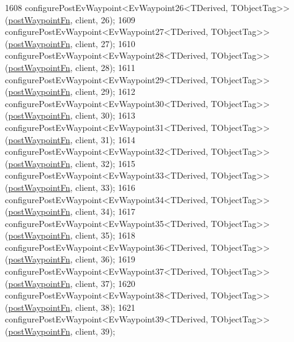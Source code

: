 \begin{DoxyCode}
1608     configurePostEvWaypoint<EvWaypoint26<TDerived, TObjectTag>>(\hyperlink{classmove__base__z__client_1_1WaypointEventDispatcher_acc538eb7506c13f7cca2268a1742dadd}{postWaypointFn}, client, 26);
1609     configurePostEvWaypoint<EvWaypoint27<TDerived, TObjectTag>>(\hyperlink{classmove__base__z__client_1_1WaypointEventDispatcher_acc538eb7506c13f7cca2268a1742dadd}{postWaypointFn}, client, 27);
1610     configurePostEvWaypoint<EvWaypoint28<TDerived, TObjectTag>>(\hyperlink{classmove__base__z__client_1_1WaypointEventDispatcher_acc538eb7506c13f7cca2268a1742dadd}{postWaypointFn}, client, 28);
1611     configurePostEvWaypoint<EvWaypoint29<TDerived, TObjectTag>>(\hyperlink{classmove__base__z__client_1_1WaypointEventDispatcher_acc538eb7506c13f7cca2268a1742dadd}{postWaypointFn}, client, 29);
1612     configurePostEvWaypoint<EvWaypoint30<TDerived, TObjectTag>>(\hyperlink{classmove__base__z__client_1_1WaypointEventDispatcher_acc538eb7506c13f7cca2268a1742dadd}{postWaypointFn}, client, 30);
1613     configurePostEvWaypoint<EvWaypoint31<TDerived, TObjectTag>>(\hyperlink{classmove__base__z__client_1_1WaypointEventDispatcher_acc538eb7506c13f7cca2268a1742dadd}{postWaypointFn}, client, 31);
1614     configurePostEvWaypoint<EvWaypoint32<TDerived, TObjectTag>>(\hyperlink{classmove__base__z__client_1_1WaypointEventDispatcher_acc538eb7506c13f7cca2268a1742dadd}{postWaypointFn}, client, 32);
1615     configurePostEvWaypoint<EvWaypoint33<TDerived, TObjectTag>>(\hyperlink{classmove__base__z__client_1_1WaypointEventDispatcher_acc538eb7506c13f7cca2268a1742dadd}{postWaypointFn}, client, 33);
1616     configurePostEvWaypoint<EvWaypoint34<TDerived, TObjectTag>>(\hyperlink{classmove__base__z__client_1_1WaypointEventDispatcher_acc538eb7506c13f7cca2268a1742dadd}{postWaypointFn}, client, 34);
1617     configurePostEvWaypoint<EvWaypoint35<TDerived, TObjectTag>>(\hyperlink{classmove__base__z__client_1_1WaypointEventDispatcher_acc538eb7506c13f7cca2268a1742dadd}{postWaypointFn}, client, 35);
1618     configurePostEvWaypoint<EvWaypoint36<TDerived, TObjectTag>>(\hyperlink{classmove__base__z__client_1_1WaypointEventDispatcher_acc538eb7506c13f7cca2268a1742dadd}{postWaypointFn}, client, 36);
1619     configurePostEvWaypoint<EvWaypoint37<TDerived, TObjectTag>>(\hyperlink{classmove__base__z__client_1_1WaypointEventDispatcher_acc538eb7506c13f7cca2268a1742dadd}{postWaypointFn}, client, 37);
1620     configurePostEvWaypoint<EvWaypoint38<TDerived, TObjectTag>>(\hyperlink{classmove__base__z__client_1_1WaypointEventDispatcher_acc538eb7506c13f7cca2268a1742dadd}{postWaypointFn}, client, 38);
1621     configurePostEvWaypoint<EvWaypoint39<TDerived, TObjectTag>>(\hyperlink{classmove__base__z__client_1_1WaypointEventDispatcher_acc538eb7506c13f7cca2268a1742dadd}{postWaypointFn}, client, 39);

\end{DoxyCode}
